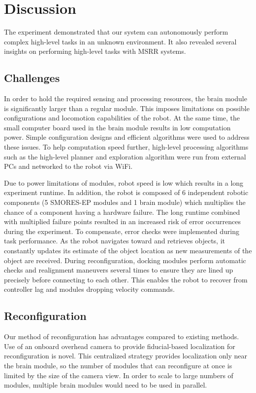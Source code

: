 \documentclass[conference]{IEEEtran}
\begin{document}
\section{Discussion}
\label{sec:discussion}
%
The experiment demonstrated that our system can autonomously perform complex high-level tasks in an unknown environment. It also revealed several insights on performing high-level tasks with MSRR systems.
\subsection{Challenges}

In order to hold the required sensing and processing resources, the brain module is significantly larger than a regular module. This imposes limitations on possible configurations and locomotion capabilities of the robot. At the same time, the small computer board used in the brain module results in low computation power. Simple configuration designs and efficient algorithms were used to address these issues. To help computation speed further, high-level processing algorithms such as the high-level planner and exploration algorithm were run from external PCs and networked to the robot via WiFi.

Due to power limitations of modules, robot speed is low which results in a long experiment runtime. In addition, the robot is composed of 6 independent robotic components (5 SMORES-EP modules and 1 brain module) which multiplies the chance of a component having a hardware failure. The long runtime combined with multiplied failure points resulted in an increased risk of error occurrences during the experiment. To compensate, error checks were implemented during task performance. As the robot navigates toward and retrieves objects, it constantly updates its estimate of the object location as new measurements of the object are received. During reconfiguration, docking modules perform automatic checks and realignment maneuvers several times to ensure they are lined up precisely before connecting to each other. This enables the robot to recover from controller lag and modules dropping velocity commands.

%
\subsection{Reconfiguration}
Our method of reconfiguration has advantages compared to existing methods.  Use of an onboard overhead camera to provide fiducial-based localization for reconfiguration is novel.  This centralized strategy provides localization only near the brain module, so the number of modules that can reconfigure at once is limited by the size of the camera view. In order to scale to large numbers of modules, multiple brain modules would need to be used in parallel.
\end{document}
